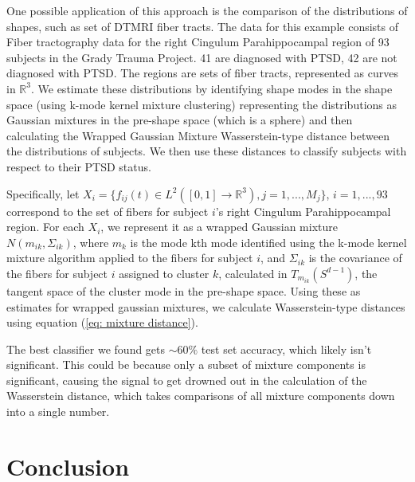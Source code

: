 \documentclass[]{article}
\begin{document}
One possible application of this approach is the comparison of the distributions of shapes, such as set of DTMRI fiber tracts. The data for this example consists of Fiber tractography data for the right Cingulum Parahippocampal region of 93 subjects in the Grady Trauma Project. 41 are diagnosed with PTSD, 42 are not diagnosed with PTSD. The regions are sets of fiber tracts, represented as curves in $\mathbb{R}^3$. We estimate these distributions by identifying shape modes in the shape space (using k-mode kernel mixture clustering) representing the distributions as Gaussian mixtures in the pre-shape space (which is a sphere) and then calculating the Wrapped Gaussian Mixture Wasserstein-type distance between the distributions of subjects. We then use these distances to classify subjects with respect to their PTSD status.

Specifically, let $X_i = \{ f_{ij}(t) \in L^2([0,1] \to \mathbb{R}^3), j = 1,...,M_j\}$, $i=1,...,93$ correspond to the set of fibers for subject $i$'s right Cingulum Parahippocampal region. For each $X_i$, we represent it as a wrapped Gaussian mixture $N(m_{ik}, \Sigma_{ik})$, where $m_k$ is the mode kth mode identified using the k-mode kernel mixture algorithm applied to the fibers for subject $i$, and $\Sigma_{ik}$ is the covariance of the fibers for subject $i$ assigned to cluster $k$, calculated in $T_{m_{ik}}(S^{d-1})$, the tangent space of the cluster mode in the pre-shape space. Using these as estimates for wrapped gaussian mixtures, we calculate Wasserstein-type distances using equation (\ref{eq: mixture distance}).       

The best classifier we found gets $\sim 60\%$ test set accuracy, which likely isn't significant. This could be because only a subset of mixture components is significant, causing the signal to get drowned out in the calculation of the Wasserstein distance, which takes comparisons of all mixture components down into a single number. 

\section{Conclusion}\label{section: conclusion}

\newpage



\cite{https://doi.org/10.48550/arxiv.1907.05254}
\cite{https://doi.org/10.48550/arxiv.0801.2250}
\cite{10.1307/mmj/1029003026}
\cite{COTFNT}
\cite{Ambrosio2013}
\cite{WGOT}
\end{document}
